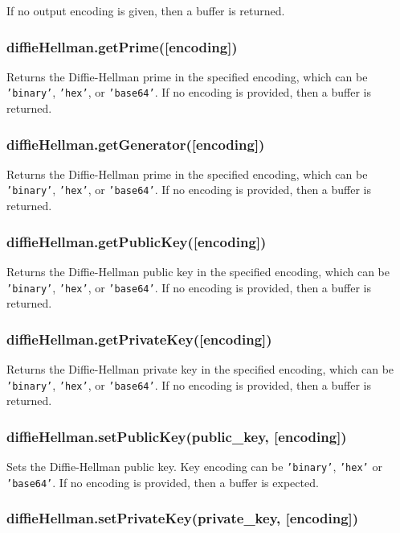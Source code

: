 If no output encoding is given, then a buffer is returned.

\subsubsection{diffieHellman.getPrime({[}encoding{]})}

Returns the Diffie-Hellman prime in the specified encoding, which can be
\texttt{'binary'}, \texttt{'hex'}, or \texttt{'base64'}. If no encoding
is provided, then a buffer is returned.

\subsubsection{diffieHellman.getGenerator({[}encoding{]})}

Returns the Diffie-Hellman prime in the specified encoding, which can be
\texttt{'binary'}, \texttt{'hex'}, or \texttt{'base64'}. If no encoding
is provided, then a buffer is returned.

\subsubsection{diffieHellman.getPublicKey({[}encoding{]})}

Returns the Diffie-Hellman public key in the specified encoding, which
can be \texttt{'binary'}, \texttt{'hex'}, or \texttt{'base64'}. If no
encoding is provided, then a buffer is returned.

\subsubsection{diffieHellman.getPrivateKey({[}encoding{]})}

Returns the Diffie-Hellman private key in the specified encoding, which
can be \texttt{'binary'}, \texttt{'hex'}, or \texttt{'base64'}. If no
encoding is provided, then a buffer is returned.

\subsubsection{diffieHellman.setPublicKey(public\_key, {[}encoding{]})}

Sets the Diffie-Hellman public key. Key encoding can be
\texttt{'binary'}, \texttt{'hex'} or \texttt{'base64'}. If no encoding
is provided, then a buffer is expected.

\subsubsection{diffieHellman.setPrivateKey(private\_key,
{[}encoding{]})}

